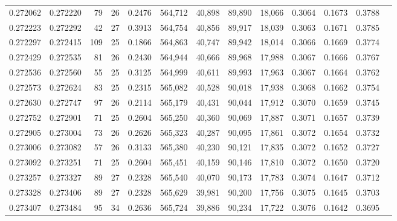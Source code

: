 \begin{tabular}{rrrrrrrrrrrrr}
0.272062 & 0.272220 &  79 &  26 &                                     0.2476 & 564,712 &  40,898 &  89,890 &  18,066 & 0.3064 & 0.1673 & 0.3788 \\
0.272223 & 0.272292 &  42 &  27 &                                     0.3913 & 564,754 &  40,856 &  89,917 &  18,039 & 0.3063 & 0.1671 & 0.3785 \\
0.272297 & 0.272415 & 109 &  25 &                                     0.1866 & 564,863 &  40,747 &  89,942 &  18,014 & 0.3066 & 0.1669 & 0.3774 \\
0.272429 & 0.272535 &  81 &  26 &                                     0.2430 & 564,944 &  40,666 &  89,968 &  17,988 & 0.3067 & 0.1666 & 0.3767 \\
0.272536 & 0.272560 &  55 &  25 &                                     0.3125 & 564,999 &  40,611 &  89,993 &  17,963 & 0.3067 & 0.1664 & 0.3762 \\
0.272573 & 0.272624 &  83 &  25 &                                     0.2315 & 565,082 &  40,528 &  90,018 &  17,938 & 0.3068 & 0.1662 & 0.3754 \\
0.272630 & 0.272747 &  97 &  26 &                                     0.2114 & 565,179 &  40,431 &  90,044 &  17,912 & 0.3070 & 0.1659 & 0.3745 \\
0.272752 & 0.272901 &  71 &  25 &                                     0.2604 & 565,250 &  40,360 &  90,069 &  17,887 & 0.3071 & 0.1657 & 0.3739 \\
0.272905 & 0.273004 &  73 &  26 &                                     0.2626 & 565,323 &  40,287 &  90,095 &  17,861 & 0.3072 & 0.1654 & 0.3732 \\
0.273006 & 0.273082 &  57 &  26 &                                     0.3133 & 565,380 &  40,230 &  90,121 &  17,835 & 0.3072 & 0.1652 & 0.3727 \\
0.273092 & 0.273251 &  71 &  25 &                                     0.2604 & 565,451 &  40,159 &  90,146 &  17,810 & 0.3072 & 0.1650 & 0.3720 \\
0.273257 & 0.273327 &  89 &  27 &                                     0.2328 & 565,540 &  40,070 &  90,173 &  17,783 & 0.3074 & 0.1647 & 0.3712 \\
0.273328 & 0.273406 &  89 &  27 &                                     0.2328 & 565,629 &  39,981 &  90,200 &  17,756 & 0.3075 & 0.1645 & 0.3703 \\
0.273407 & 0.273484 &  95 &  34 &                                     0.2636 & 565,724 &  39,886 &  90,234 &  17,722 & 0.3076 & 0.1642 & 0.3695 \\

\end{tabular}
